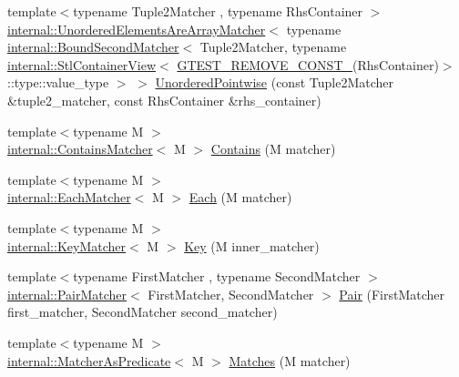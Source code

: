 \begin{DoxyCompactItemize}
\item 
{\footnotesize template$<$typename Tuple2\+Matcher , typename Rhs\+Container $>$ }\\\hyperlink{classtesting_1_1internal_1_1_unordered_elements_are_array_matcher}{internal\+::\+Unordered\+Elements\+Are\+Array\+Matcher}$<$ typename \hyperlink{classtesting_1_1internal_1_1_bound_second_matcher}{internal\+::\+Bound\+Second\+Matcher}$<$ Tuple2\+Matcher, typename \hyperlink{classtesting_1_1internal_1_1_stl_container_view}{internal\+::\+Stl\+Container\+View}$<$ \hyperlink{gtest-internal_8h_a2ffec8c60510eb130af387f5ce9a756a}{G\+T\+E\+S\+T\+\_\+\+R\+E\+M\+O\+V\+E\+\_\+\+C\+O\+N\+S\+T\+\_\+}(Rhs\+Container)$>$\+::type\+::value\+\_\+type $>$ $>$ \hyperlink{namespacetesting_a3e800c56ae70a6d9955077a75d4971f1}{Unordered\+Pointwise} (const Tuple2\+Matcher \&tuple2\+\_\+matcher, const Rhs\+Container \&rhs\+\_\+container)
\item 
{\footnotesize template$<$typename M $>$ }\\\hyperlink{classtesting_1_1internal_1_1_contains_matcher}{internal\+::\+Contains\+Matcher}$<$ M $>$ \hyperlink{namespacetesting_a2a12af7db4752797d06c1182b2470933}{Contains} (M matcher)
\item 
{\footnotesize template$<$typename M $>$ }\\\hyperlink{classtesting_1_1internal_1_1_each_matcher}{internal\+::\+Each\+Matcher}$<$ M $>$ \hyperlink{namespacetesting_a42743c985b1e02dc373ab7517ca1e740}{Each} (M matcher)
\item 
{\footnotesize template$<$typename M $>$ }\\\hyperlink{classtesting_1_1internal_1_1_key_matcher}{internal\+::\+Key\+Matcher}$<$ M $>$ \hyperlink{namespacetesting_a6212e76b542f4ffd3079de59092a826a}{Key} (M inner\+\_\+matcher)
\item 
{\footnotesize template$<$typename First\+Matcher , typename Second\+Matcher $>$ }\\\hyperlink{classtesting_1_1internal_1_1_pair_matcher}{internal\+::\+Pair\+Matcher}$<$ First\+Matcher, Second\+Matcher $>$ \hyperlink{namespacetesting_ac7520de8af26d3085513eeeb68561889}{Pair} (First\+Matcher first\+\_\+matcher, Second\+Matcher second\+\_\+matcher)
\item 
{\footnotesize template$<$typename M $>$ }\\\hyperlink{classtesting_1_1internal_1_1_matcher_as_predicate}{internal\+::\+Matcher\+As\+Predicate}$<$ M $>$ \hyperlink{namespacetesting_ad53b509ae9cd51040d67f668f99702ae}{Matches} (M matcher)
\item 

\end{DoxyCompactItemize}
